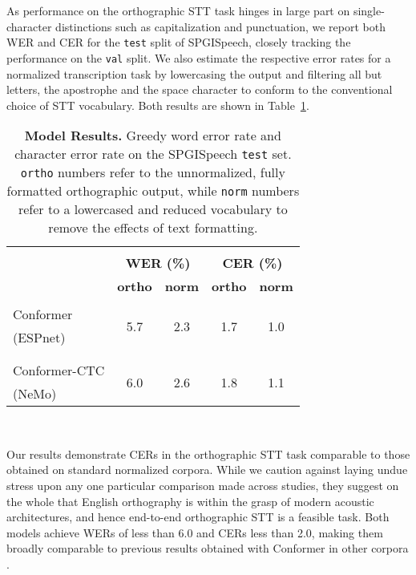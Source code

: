 \documentclass{article}
\newcommand\tabref{Table~\ref}
\newcommand{\corpus}{SPGISpeech}
\begin{document}
As performance on the orthographic STT task hinges in large part on single-character distinctions such as capitalization and punctuation, we report both WER and CER for the \texttt{test} split of SPGISpeech, closely tracking the performance on the \texttt{val} split. We also estimate the respective error rates for a normalized transcription task by lowercasing the output and filtering all but letters, the apostrophe and the space character to conform to the conventional choice of STT vocabulary. Both results are shown in \tabref{tab:wer}.


\begin{table}\centering
\begin{tabular}{l|cccc}
\hline
  \\ [-2.2ex]
  & \multicolumn{2}{c}{\textbf{WER (\%)}} & \multicolumn{2}{c}{\textbf{CER (\%)}} \\
  & \textbf{ortho} & \textbf{norm} & \textbf{ortho} & \textbf{norm} \\
  \hline
  \hline
  \\ [-2.0ex]
  Conformer & \multirow{2}{*}{5.7} & \multirow{2}{*}{2.3} & \multirow{2}{*}{1.7} & \multirow{2}{*}{1.0} \\
  (ESPnet) & & \\
  \\ [-2.0ex]
  \hline
  \\ [-2.0ex]
  Conformer-CTC & \multirow{2}{*}{6.0} & \multirow{2}{*}{2.6}  & \multirow{2}{*}{1.8} & \multirow{2}{*}{1.1} \\
  (NeMo) & & \\
\hline
\end{tabular}
 \\ [0.5ex]
\caption{\textbf{Model Results.} Greedy word error rate and character error rate on the \corpus{} \texttt{test} set. \texttt{ortho} numbers refer to the unnormalized, fully formatted orthographic output, while \texttt{norm} numbers refer to a lowercased and reduced vocabulary to remove the effects of text formatting.}
\label{tab:wer}
\end{table}


Our results demonstrate CERs in the orthographic STT task comparable to those obtained on standard normalized corpora.  While we caution against laying undue stress upon any one particular comparison made across studies, they suggest on the whole that English orthography is within the grasp of modern acoustic architectures, and hence end-to-end orthographic STT is a feasible task.    Both models achieve WERs of less than 6.0 and CERs less than 2.0, making them broadly comparable to previous results obtained with Conformer in other corpora \cite{gulati2020conformer}.
\end{document}
